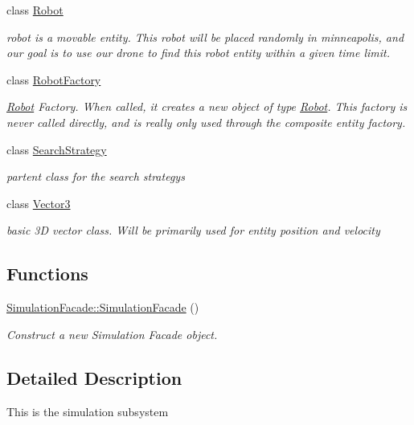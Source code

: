 \begin{DoxyCompactItemize}
class \hyperlink{classRobot}{Robot}
\begin{DoxyCompactList}\small\item\em robot is a movable entity. This robot will be placed randomly in minneapolis, and our goal is to use our drone to find this robot entity within a given time limit. \end{DoxyCompactList}\item 
class \hyperlink{classRobotFactory}{Robot\+Factory}
\begin{DoxyCompactList}\small\item\em \hyperlink{classRobot}{Robot} Factory. When called, it creates a new object of type \hyperlink{classRobot}{Robot}. This factory is never called directly, and is really only used through the composite entity factory. \end{DoxyCompactList}\item 
class \hyperlink{classSearchStrategy}{Search\+Strategy}
\begin{DoxyCompactList}\small\item\em partent class for the search strategys \end{DoxyCompactList}\item 
class \hyperlink{classVector3}{Vector3}
\begin{DoxyCompactList}\small\item\em basic 3D vector class. Will be primarily used for entity position and velocity \end{DoxyCompactList}\end{DoxyCompactItemize}
\subsection*{Functions}
\begin{DoxyCompactItemize}
\item 
\mbox{\label{group__simulation_gaeecad83c3d8ad32ebf60c9f49fda030f}} 
\hyperlink{group__simulation_gaeecad83c3d8ad32ebf60c9f49fda030f}{Simulation\+Facade\+::\+Simulation\+Facade} ()
\begin{DoxyCompactList}\small\item\em Construct a new Simulation Facade object. \end{DoxyCompactList}\end{DoxyCompactItemize}


\subsection{Detailed Description}
This is the simulation subsystem 